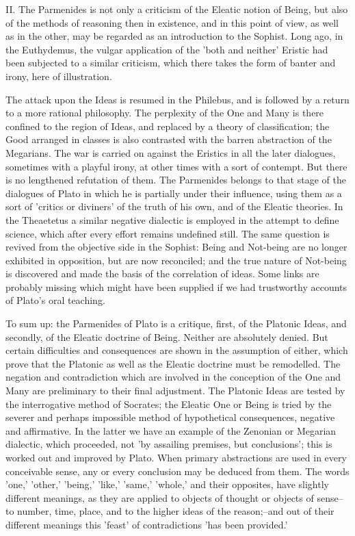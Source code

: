 II. The Parmenides is not only a criticism of the Eleatic notion of
Being, but also of the methods of reasoning then in existence, and
in this point of view, as well as in the other, may be regarded as an
introduction to the Sophist. Long ago, in the Euthydemus, the vulgar
application of the 'both and neither' Eristic had been subjected to a
similar criticism, which there takes the form of banter and irony, here
of illustration.

The attack upon the Ideas is resumed in the Philebus, and is followed
by a return to a more rational philosophy. The perplexity of the One and
Many is there confined to the region of Ideas, and replaced by a theory
of classification; the Good arranged in classes is also contrasted with
the barren abstraction of the Megarians. The war is carried on against
the Eristics in all the later dialogues, sometimes with a playful irony,
at other times with a sort of contempt. But there is no lengthened
refutation of them. The Parmenides belongs to that stage of the
dialogues of Plato in which he is partially under their influence, using
them as a sort of 'critics or diviners' of the truth of his own, and of
the Eleatic theories. In the Theaetetus a similar negative dialectic
is employed in the attempt to define science, which after every effort
remains undefined still. The same question is revived from the objective
side in the Sophist: Being and Not-being are no longer exhibited in
opposition, but are now reconciled; and the true nature of Not-being is
discovered and made the basis of the correlation of ideas. Some
links are probably missing which might have been supplied if we had
trustworthy accounts of Plato's oral teaching.

To sum up: the Parmenides of Plato is a critique, first, of the Platonic
Ideas, and secondly, of the Eleatic doctrine of Being. Neither are
absolutely denied. But certain difficulties and consequences are shown
in the assumption of either, which prove that the Platonic as well as
the Eleatic doctrine must be remodelled. The negation and contradiction
which are involved in the conception of the One and Many are preliminary
to their final adjustment. The Platonic Ideas are tested by the
interrogative method of Socrates; the Eleatic One or Being is tried by
the severer and perhaps impossible method of hypothetical consequences,
negative and affirmative. In the latter we have an example of the
Zenonian or Megarian dialectic, which proceeded, not 'by assailing
premises, but conclusions'; this is worked out and improved by Plato.
When primary abstractions are used in every conceivable sense, any or
every conclusion may be deduced from them. The words 'one,' 'other,'
'being,' 'like,' 'same,' 'whole,' and their opposites, have slightly
different meanings, as they are applied to objects of thought or
objects of sense--to number, time, place, and to the higher ideas of
the reason;--and out of their different meanings this 'feast' of
contradictions 'has been provided.'

